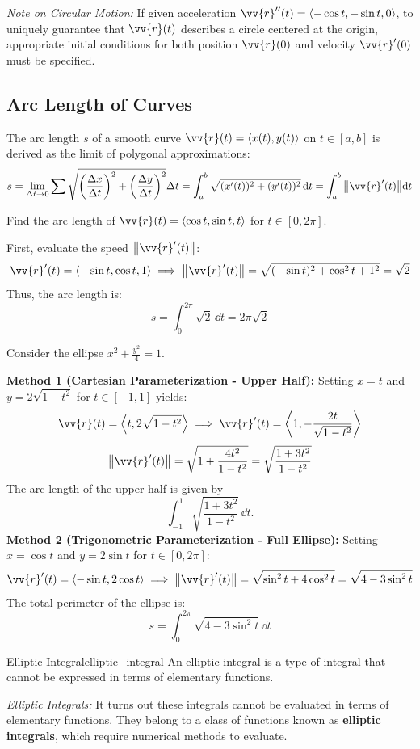 \textit{Note on Circular Motion:} If given acceleration $\vv{r}''(t) = \ang{-\cos t, -\sin t, 0}$, to uniquely guarantee that $\vv{r}(t)$ describes a circle centered at the origin, appropriate initial conditions for both position $\vv{r}(0)$ and velocity $\vv{r}'(0)$ must be specified.

\subsection{Arc Length of Curves}

The arc length $s$ of a smooth curve $\vv{r}(t) = \ang{x(t), y(t)}$ on $t \in [a, b]$ is derived as the limit of polygonal approximations:
\[
s = \lim_{\Delta t \to 0} \sum \sqrt{\left(\frac{\Delta x}{\Delta t}\right)^2 + \left(\frac{\Delta y}{\Delta t}\right)^2} \Delta t 
= \int_a^b \sqrt{(x'(t))^2 + (y'(t))^2} \, \dd{t} 
= \int_a^b \norm{\vv{r}'(t)} \dd{t}
\]

\begin{example}
Find the arc length of $\vv{r}(t) = \ang{\cos t, \sin t, t}$ for $t \in [0, 2\pi]$.

First, evaluate the speed $\norm{\vv{r}'(t)}$:
\[
\vv{r}'(t) = \ang{-\sin t, \cos t, 1} \implies \norm{\vv{r}'(t)} = \sqrt{(-\sin t)^2 + \cos^2 t + 1^2} = \sqrt{2}
\]
Thus, the arc length is:
\[
s = \int_0^{2\pi} \sqrt{2} \, \dd{t} = 2\pi\sqrt{2}
\]
\end{example}

\begin{example}
Consider the ellipse $x^2 + \frac{y^2}{4} = 1$.

\textbf{Method 1 (Cartesian Parameterization - Upper Half):}
Setting $x = t$ and $y = 2\sqrt{1 - t^2}$ for $t \in [-1, 1]$ yields:
\[
\vv{r}(t) = \ang{t, 2\sqrt{1 - t^2}} \implies \vv{r}'(t) = \ang{1, -\frac{2t}{\sqrt{1 - t^2}}}
\]
\[
\norm{\vv{r}'(t)} = \sqrt{1 + \frac{4t^2}{1 - t^2}} = \sqrt{\frac{1 + 3t^2}{1 - t^2}}
\]
The arc length of the upper half is given by 
\[
\int_{-1}^1 \sqrt{\frac{1 + 3t^2}{1 - t^2}} \, \dd{t}.
\]
\textbf{Method 2 (Trigonometric Parameterization - Full Ellipse):}
Setting $x = \cos t$ and $y = 2\sin t$ for $t \in [0, 2\pi]$:
\[
\vv{r}'(t) = \ang{-\sin t, 2\cos t} \implies \norm{\vv{r}'(t)} = \sqrt{\sin^2 t + 4\cos^2 t} = \sqrt{4 - 3\sin^2 t}
\]
The total perimeter of the ellipse is:
\[
s = \int_0^{2\pi} \sqrt{4 - 3\sin^2 t} \, \dd{t}
\]
\end{example}

\begin{definition}{Elliptic Integral}{elliptic_integral}
An elliptic integral is a type of integral that cannot be expressed in terms of elementary functions.
\end{definition}

\textit{Elliptic Integrals:} It turns out these integrals cannot be evaluated in terms of elementary functions. They belong to a class of functions known as \textbf{elliptic integrals}, which require numerical methods to evaluate.
